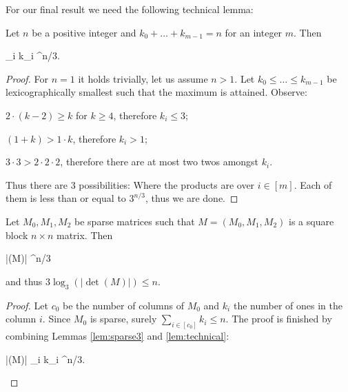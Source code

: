 For our final result we need the following technical lemma:

\begin{lem}
\label{lem:technical}
Let $n$ be a positive integer and $k_0 + \dots + k_{m-1} = n$ for an integer $m$. Then
\begin{cosyeqnarray}
	\prod_{i \in [m]} k_i ^{n/3}.
\end{cosyeqnarray}%
\end{lem}
\begin{proof}
For $n=1$ it holds trivially, let us assume $n > 1$. Let $k_0 \leq \dots \leq k_{m-1}$ be lexicographically smallest such that the maximum is attained. Observe:
\begin{cosyitemize}
	\item $2 \cdot (k-2) \geq k$ for $k \geq 4$, therefore $k_i \leq 3$;
	\item $(1+k) > 1 \cdot k$, therefore $k_i > 1$;
	\item $3 \cdot 3 > 2 \cdot 2 \cdot 2$, therefore there are at most two twos amongst $k_i$.
\end{cosyitemize}%
Thus there are 3 possibilities:
Where the products are over $i \in [m]$. Each of them is less than or equal to $3^{n/3}$, thus we are done.
\end{proof}

\begin{lem}
\label{lem:3-block-sparse-det}
Let $M_0,M_1,M_2$ be sparse matrices such that $M = (M_0,M_1,M_2)$ is a  square block $n \times n$ matrix. Then
\begin{cosyeqnarray}
 	|\det(M)| ^{n/3}
\end{cosyeqnarray}%
and thus $3 \log_3(|\det(M)|) \leq n$.
\end{lem}
\begin{proof}
Let $c_0$ be the number of columns of $M_0$ and $k_i$ the number of ones in the column $i$. Since $M_0$ is sparse, surely $\sum_{i \in [c_0]} k_i \leq n$. The proof is finished by combining Lemmas \ref{lem:sparse3} and \ref{lem:technical}:
\begin{cosyeqnarray}
	|\det(M)| \leq \prod_{i \in [c_0]} k_i ^{n/3}.
\end{cosyeqnarray}%
\end{proof}

